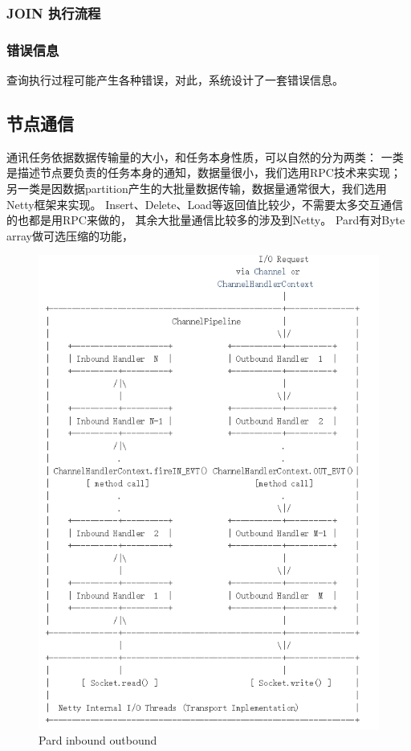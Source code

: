 \documentclass[a4paper, 12pt]{ctexart}
\begin{document}
\subsubsection{JOIN 执行流程}


\subsubsection{错误信息}
查询执行过程可能产生各种错误，对此，系统设计了一套错误信息。

\subsection{节点通信}
通讯任务依据数据传输量的大小，和任务本身性质，可以自然的分为两类：
一类是描述节点要负责的任务本身的通知，数据量很小，我们选用RPC技术来实现；
另一类是因数据partition产生的大批量数据传输，数据量通常很大，我们选用Netty框架来实现。
Insert、Delete、Load等返回值比较少，不需要太多交互通信的也都是用RPC来做的，
其余大批量通信比较多的涉及到Netty。
Pard有对Byte array做可选压缩的功能，


\begin{figure}[htbp]
	\centering
	\includegraphics[width=0.7\linewidth]{figure/iobound.png}
	\caption{Pard inbound outbound}
	\label{fig:iobound}
\end{figure}
\end{document}
